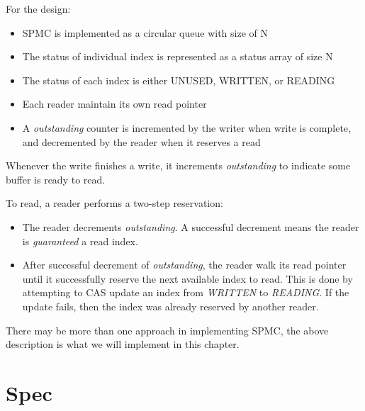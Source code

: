For the design:
\begin{itemize}
    \item SPMC is implemented as a circular queue with size of N
    \item The status of individual index is represented as a status array of size N
    \item The status of each index is either UNUSED, WRITTEN, or READING
    \item Each reader maintain its own read pointer
    \item A \textit{outstanding} counter is incremented by the writer when write is complete, 
    and decremented by the reader when it reserves a read
\end{itemize}

Whenever the write finishes a write, it increments \textit{outstanding} to
indicate some buffer is ready to read.\newline 

To read, a reader performs a two-step reservation: 
\begin{itemize}
    \item The reader decrements \textit{outstanding}. A successful decrement means
    the reader is \textit{guaranteed} a read index.
    \item After successful decrement of \textit{outstanding}, the reader walk
    its read pointer until it successfully reserve the next available index to
    read. This is done by attempting to CAS update an index from \textit{WRITTEN} to
    \textit{READING}. If the update fails, then the index was already reserved by another 
    reader.
\end{itemize}

There may be more than one approach in implementing SPMC, the above description
is what we will implement in this chapter.

\section{Spec}

